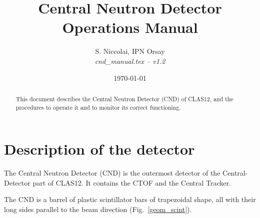 \documentclass[12pt]{article}
\begin{document}
\title{Central Neutron Detector Operations Manual}

\vskip 0.5cm

\author{S. Niccolai, IPN Orsay\\[0.2ex]
{\it cnd\_manual.tex -- v1.2}}

\date \today
\maketitle
%
\begin{abstract}This document describes the Central Neutron Detector (CND) of CLAS12, and the procedures to operate it and to monitor its correct functioning. 
\end{abstract}
\newpage
\thispagestyle{empty}

 
\setcounter{page}{1}
 
\tableofcontents{}
 
 
 
\newpage 
{}
\setcounter{page}{1}
\section{Description of the detector}\label{cnd-section}
The Central Neutron Detector (CND) is the outermost detector of the Central-Detector part of CLAS12. It contains the CTOF and the Central Tracker. 

The CND is a barrel of plastic scintillator bars of trapezoidal shape, all with their long sides parallel to the beam direction (Fig.~\ref{geom_scint}). 
\end{document}
